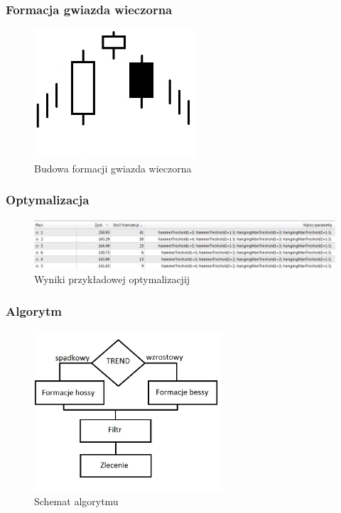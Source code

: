 \documentclass{beamer}
\begin{document}

\begin{frame}
\frametitle{Formacja gwiazda wieczorna}
\begin{figure}[ht]
\begin{center}
\includegraphics[width=6cm]{star.jpg}
\caption{Budowa formacji gwiazda wieczorna}
\end{center}
\end{figure} 


\end{frame}


\begin{frame}
\frametitle{Optymalizacja}
\begin{figure}[ht]
\begin{center}
\includegraphics[width=12cm]{result.jpg}
\caption{Wyniki przykładowej optymalizacjij}
\end{center}
\end{figure} 


\end{frame}


\begin{frame}
\frametitle{Algorytm}
\begin{figure}[ht]
\begin{center}
\includegraphics[width=7cm]{algorytm.jpg}
\caption{Schemat algorytmu}
\end{center}
\end{figure} 


\end{frame}
\end{document}
